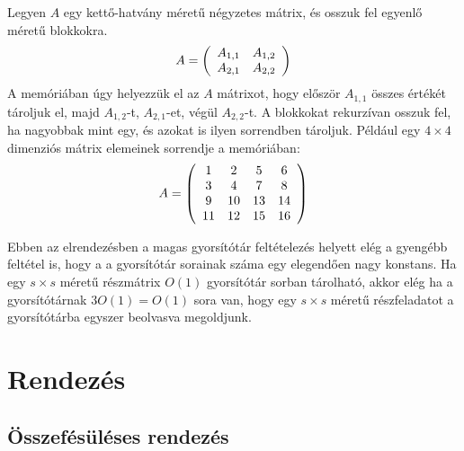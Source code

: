 \documentclass[12pt]{report}
\begin{document}
Legyen $A$ egy kettő-hatvány méretű négyzetes mátrix,
és osszuk fel egyenlő méretű blokkokra.
\begin{align*}
A=\left(
\begin{array}{c c}  
A_{1,1} & A_{1,2} \\
A_{2,1} & A_{2,2}
\end{array}
\right)
\end{align*}
A memóriában úgy helyezzük el az $A$ mátrixot,
hogy először $A_{1,1}$ összes értékét tároljuk el, majd $A_{1,2}$-t,
$A_{2,1}$-et, végül $A_{2,2}$-t.
A blokkokat rekurzívan osszuk fel, ha nagyobbak mint egy,
és azokat is ilyen sorrendben tároljuk.
Például egy $4 \times 4$ dimenziós mátrix elemeinek sorrendje a memóriában:
\begin{align*}
A=\left(
\begin{array}{c c c c c c c c}  
1  & 2  & 5  & 6 \\
3  & 4  & 7  & 8 \\
9  & 10 & 13 & 14 \\
11 & 12 & 15 & 16
\end{array}
\right)
\end{align*}

Ebben az elrendezésben a magas gyorsítótár feltételezés helyett elég a gyengébb feltétel is,
hogy a a gyorsítótár sorainak száma egy elegendően nagy konstans.\cite{prokop}
Ha egy $s \times s$ méretű részmátrix $O(1)$ gyorsítótár sorban tárolható,
akkor elég ha a gyorsítótárnak $3O(1)=O(1)$ sora van,
hogy egy $s \times s$ méretű részfeladatot a gyorsítótárba egyszer beolvasva megoldjunk.

\section{Rendezés}

\subsection{Összefésüléses rendezés}
\end{document}

